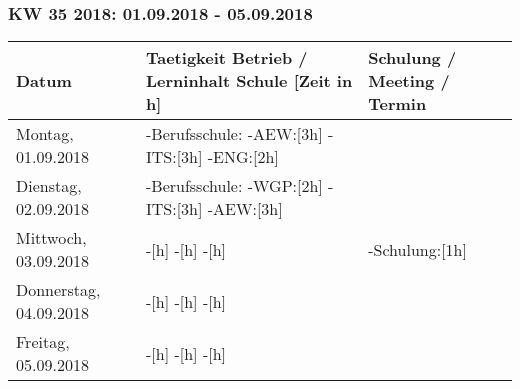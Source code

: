 \documentclass{pfdoc}
\begin{document}
\subsubsection{KW 35 2018: 01.09.2018 - 05.09.2018}
\begin{tabular}{|L{2cm}|L{10cm}|L{5cm}|}
\hline
\textbf{Datum} & \textbf{Taetigkeit Betrieb / Lerninhalt Schule [Zeit in h]} & \textbf{Schulung / Meeting / Termin} \\
\hline
Montag, 01.09.2018
&
-Berufsschule: \linebreak
-AEW:[3h] \linebreak
-ITS:[3h] \linebreak
-ENG:[2h] \linebreak
&
\\
\hline
Dienstag, 02.09.2018
&
-Berufsschule: \linebreak
-WGP:[2h] \linebreak
-ITS:[3h] \linebreak
-AEW:[3h] \linebreak
&
\\
\hline
Mittwoch, 03.09.2018
&
-[h] \linebreak
-[h] \linebreak
-[h] \linebreak
&
-Schulung:[1h] \linebreak
\\
\hline
Donnerstag, 04.09.2018
&
-[h] \linebreak
-[h] \linebreak
-[h] \linebreak
&
\\
\hline
Freitag, 05.09.2018
&
-[h] \linebreak
-[h] \linebreak
-[h] \linebreak
&
\\
\hline
\end{tabular}
\vfill
{}

\newpage
\end{document}
